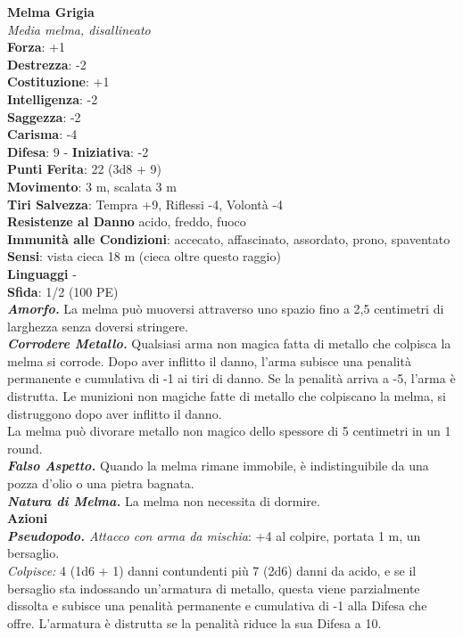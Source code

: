 \begin{multicols}{2}
\medskip\textbf{Melma Grigia}\\
\emph{Media melma, disallineato}\\
\textbf{Forza}: +1\\
\textbf{Destrezza}: -2\\
\textbf{Costituzione}: +1\\
\textbf{Intelligenza}: -2\\
\textbf{Saggezza}: -2\\
\textbf{Carisma}: -4\\
\textbf{Difesa}: 9 - \textbf{Iniziativa}: -2\\
\textbf{Punti Ferita}: 22 (3d8 + 9)\\
\textbf{Movimento}: 3 m, scalata 3 m\\
\textbf{Tiri Salvezza}: Tempra +9, Riflessi -4, Volontà -4\\
\textbf{Resistenze al Danno} acido, freddo, fuoco\\
\textbf{Immunità alle Condizioni}: accecato, affascinato, assordato, prono, spaventato
\textbf{Sensi}: vista cieca 18 m (cieca oltre questo raggio)\\
\textbf{Linguaggi} -\\
\textbf{Sfida}: 1/2 (100 PE)\smallskip\\
\emph{\textbf{Amorfo.}} La melma può muoversi attraverso uno spazio fino a 2,5 centimetri di larghezza senza doversi stringere.\\
\emph{\textbf{Corrodere Metallo.}} Qualsiasi arma non magica fatta di metallo che colpisca la melma si corrode. Dopo aver inflitto il danno, l'arma subisce una penalità permanente e cumulativa di -1 ai tiri di danno. Se la penalità arriva a -5, l'arma è distrutta. Le munizioni non magiche fatte di metallo che colpiscano la melma, si distruggono dopo aver inflitto il danno.\\
La melma può divorare metallo non magico dello spessore di 5 centimetri in un 1 round.\\
\emph{\textbf{Falso Aspetto.}} Quando la melma rimane immobile, è indistinguibile da una pozza d'olio o una pietra bagnata.\\
\emph{\textbf{Natura di Melma.}} La melma non necessita di dormire. \\
\smallskip\textbf{Azioni}\\
\emph{\textbf{Pseudopodo.} Attacco con arma da mischia}: +4 al colpire, portata 1 m, un bersaglio.\\
\emph{Colpisce:} 4 (1d6 + 1) danni contundenti più 7 (2d6) danni da acido, e se il bersaglio sta indossando un'armatura di metallo, questa viene parzialmente dissolta e subisce una penalità permanente e cumulativa di -1 alla Difesa che offre. L'armatura è distrutta se la penalità riduce la sua Difesa a 10.\\

\end{multicols}

